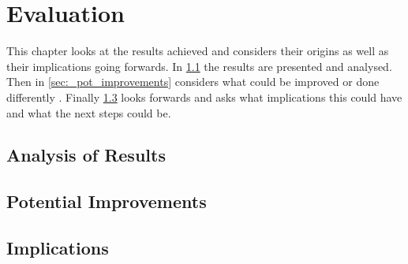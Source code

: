 
\cleardoublepage
\chapter{Evaluation}
\label{cha:evaluation}

This chapter looks at the results achieved and considers their origins as well as their implications going forwards. In \ref{sec:analysis} the results are presented and analysed. Then in \ref{sec:_pot_improvements} considers what could be improved or done differently . Finally \ref{sec:implications} looks forwards and asks what implications this could have and what the next steps could be.

\section{Analysis of Results}
\label{sec:analysis}

\section{Potential Improvements}
\label{sec:pot_improvement}

\section{Implications}
\label{sec:implications}
